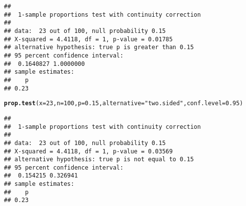\documentclass{article}\usepackage[]{graphicx}\usepackage[]{color}
\makeatletter
\newcommand{\hlnum}[1]{\textcolor[rgb]{0.686,0.059,0.569}{#1}}%
\newcommand{\hlstr}[1]{\textcolor[rgb]{0.192,0.494,0.8}{#1}}%
\newcommand{\hlstd}[1]{\textcolor[rgb]{0.345,0.345,0.345}{#1}}%
\newcommand{\hlkwc}[1]{\textcolor[rgb]{0.333,0.667,0.333}{#1}}%
\newcommand{\hlkwd}[1]{\textcolor[rgb]{0.737,0.353,0.396}{\textbf{#1}}}%
\newenvironment{kframe}{%
 \def\at@end@of@kframe{}%
 \ifinner\ifhmode%
  \def\at@end@of@kframe{\end{minipage}}%
  \begin{minipage}{\columnwidth}%
 \fi\fi%
 \def\FrameCommand##1{\hskip\@totalleftmargin \hskip-\fboxsep
 \colorbox{shadecolor}{##1}\hskip-\fboxsep
     \hskip-\linewidth \hskip-\@totalleftmargin \hskip\columnwidth}%
 \MakeFramed {\advance\hsize-\width
   \@totalleftmargin\z@ \linewidth\hsize
   \@setminipage}}%
 {\par\unskip\endMakeFramed%
 \at@end@of@kframe}
\newenvironment{knitrout}{}{} %
\makeatother
\begin{document}
\begin{knitrout}
\begin{kframe}
\begin{alltt}
\end{alltt}
\begin{verbatim}
## 
## 	1-sample proportions test with continuity correction
## 
## data:  23 out of 100, null probability 0.15
## X-squared = 4.4118, df = 1, p-value = 0.01785
## alternative hypothesis: true p is greater than 0.15
## 95 percent confidence interval:
##  0.1640827 1.0000000
## sample estimates:
##    p 
## 0.23
\end{verbatim}
\begin{alltt}
\hlkwd{prop.test}\hlstd{(}\hlkwc{x}\hlstd{=}\hlnum{23}\hlstd{,} \hlkwc{n}\hlstd{=}\hlnum{100}\hlstd{,} \hlkwc{p}\hlstd{=}\hlnum{0.15}\hlstd{,} \hlkwc{alternative}\hlstd{=}\hlstr{"two.sided"}\hlstd{,} \hlkwc{conf.level}\hlstd{=}\hlnum{0.95}\hlstd{)}
\end{alltt}
\begin{verbatim}
## 
## 	1-sample proportions test with continuity correction
## 
## data:  23 out of 100, null probability 0.15
## X-squared = 4.4118, df = 1, p-value = 0.03569
## alternative hypothesis: true p is not equal to 0.15
## 95 percent confidence interval:
##  0.154215 0.326941
## sample estimates:
##    p 
## 0.23
\end{verbatim}
\end{kframe}
\end{knitrout}
\end{document}
